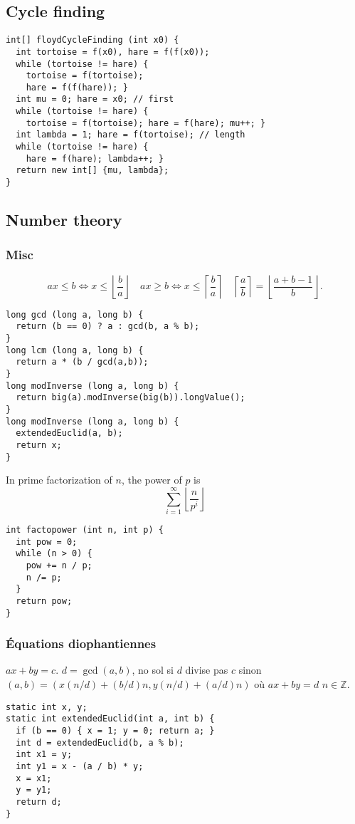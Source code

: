 \subsection{Cycle finding}
\begin{lstlisting}
int[] floydCycleFinding (int x0) {
  int tortoise = f(x0), hare = f(f(x0));
  while (tortoise != hare) {
    tortoise = f(tortoise);
    hare = f(f(hare)); }
  int mu = 0; hare = x0; // first
  while (tortoise != hare) {
    tortoise = f(tortoise); hare = f(hare); mu++; }
  int lambda = 1; hare = f(tortoise); // length
  while (tortoise != hare) {
    hare = f(hare); lambda++; }
  return new int[] {mu, lambda};
}
\end{lstlisting}
\subsection{Number theory}
\subsubsection{Misc}
\[
  ax \leq b \Leftrightarrow x \leq \left\lfloor \frac{b}{a} \right\rfloor \quad
  ax \geq b \Leftrightarrow x \leq \left\lceil \frac{b}{a} \right\rceil \quad
  \left\lceil \frac{a}{b} \right\rceil = \left\lfloor \frac{a+b-1}{b} \right\rfloor.
\]
\begin{lstlisting}
long gcd (long a, long b) {
  return (b == 0) ? a : gcd(b, a % b);
}
long lcm (long a, long b) {
  return a * (b / gcd(a,b));
}
long modInverse (long a, long b) {
  return big(a).modInverse(big(b)).longValue();
}
long modInverse (long a, long b) {
  extendedEuclid(a, b);
  return x;
}
\end{lstlisting}
In prime factorization of $n$, the power of $p$ is
\[\sum_{i=1}^{\infty} \left\lfloor \frac{n}{p^i} \right\rfloor\]
\begin{lstlisting}
int factopower (int n, int p) {
  int pow = 0;
  while (n > 0) {
    pow += n / p;
    n /= p;
  }
  return pow;
}
\end{lstlisting}

\subsubsection{Équations diophantiennes}
$ax + by = c$. $d = \gcd(a,b)$, no sol si $d$ divise pas $c$ sinon $(a,b) = (x (n/d) + (b/d)n, y (n/d) + (a/d)n)$ où $ax + by = d$ $n \in \mathbb{Z}$.
\begin{lstlisting}
static int x, y;
static int extendedEuclid(int a, int b) {
  if (b == 0) { x = 1; y = 0; return a; }
  int d = extendedEuclid(b, a % b);
  int x1 = y;
  int y1 = x - (a / b) * y;
  x = x1;
  y = y1;
  return d;
}
\end{lstlisting}
